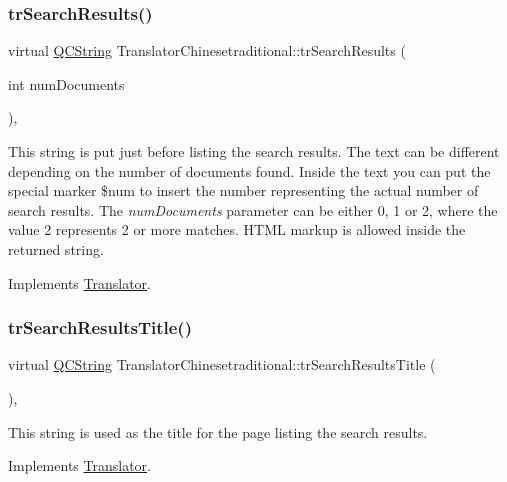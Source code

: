 \subsubsection{\texorpdfstring{trSearchResults()}{trSearchResults()}}
{\footnotesize\ttfamily virtual \mbox{\hyperlink{class_q_c_string}{Q\+C\+String}} Translator\+Chinesetraditional\+::tr\+Search\+Results (\begin{DoxyParamCaption}\item[{int}]{num\+Documents }\end{DoxyParamCaption})\hspace{0.3cm}{\ttfamily [inline]}, {\ttfamily [virtual]}}

This string is put just before listing the search results. The text can be different depending on the number of documents found. Inside the text you can put the special marker \$num to insert the number representing the actual number of search results. The {\itshape num\+Documents} parameter can be either 0, 1 or 2, where the value 2 represents 2 or more matches. H\+T\+ML markup is allowed inside the returned string. 

Implements \mbox{\hyperlink{class_translator}{Translator}}.

\mbox{\label{class_translator_chinesetraditional_ad8c097af58cce68a9c3eb92788ea5750}} 
\subsubsection{\texorpdfstring{trSearchResultsTitle()}{trSearchResultsTitle()}}
{\footnotesize\ttfamily virtual \mbox{\hyperlink{class_q_c_string}{Q\+C\+String}} Translator\+Chinesetraditional\+::tr\+Search\+Results\+Title (\begin{DoxyParamCaption}{ }\end{DoxyParamCaption})\hspace{0.3cm}{\ttfamily [inline]}, {\ttfamily [virtual]}}

This string is used as the title for the page listing the search results. 

Implements \mbox{\hyperlink{class_translator}{Translator}}.

\mbox{\label{class_translator_chinesetraditional_ac0396dc7e8551600fb718e8a555fa392}} 
